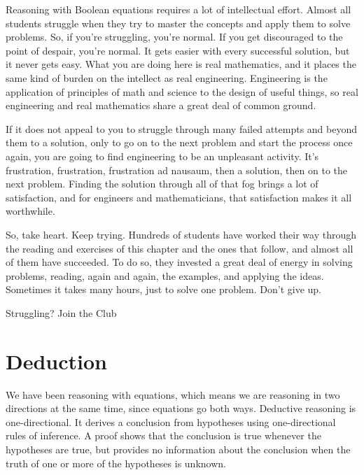 \begin{aside}
Reasoning with Boolean equations requires a lot of intellectual effort.
Almost all students struggle when they try to master the concepts 
and apply them to solve problems. 
So, if you're struggling, you're normal.
If you get discouraged to the point of despair, you're normal.
It gets easier with every successful solution, but it never gets easy.
What you are doing here is real mathematics, and it places the same
kind of burden on the intellect as real engineering.
Engineering is the application of principles 
of math and science to the design of useful things,
so real engineering and real mathematics share a great deal of common ground.

If it does not appeal to you to struggle through many
failed attempts and beyond them to a solution, only to
go on to the next problem and start the process once again, 
you are going to find engineering to be an unpleasant activity. 
It's frustration, frustration, frustration
ad nausaum, then a solution, then on to the next problem. 
Finding the solution through all of that fog
brings a lot of satisfaction, and for engineers and mathematicians,
that satisfaction makes it all worthwhile.

So, take heart. Keep trying. 
Hundreds of students have worked their way through the reading
and exercises of this chapter and the ones that follow, 
and almost all of them have succeeded.
To do so, they invested a great deal of energy in solving problems,
reading, again and again, the examples, and applying the ideas.
Sometimes it takes many hours, just to solve one problem.
Don't give up.

\caption{Struggling? Join the Club}
\label{aside:struggling}
\end{aside}

\section{Deduction}
\label{sec:deduction}

We have been reasoning with equations, which means we are reasoning in two directions
at the same time, since equations go both ways. Deductive reasoning is one-directional.
It derives a conclusion from hypotheses using one-directional rules of inference.
A proof shows that the conclusion is true whenever the hypotheses are true, but provides
no information about the conclusion when the truth of one or more of the hypotheses is
unknown.

